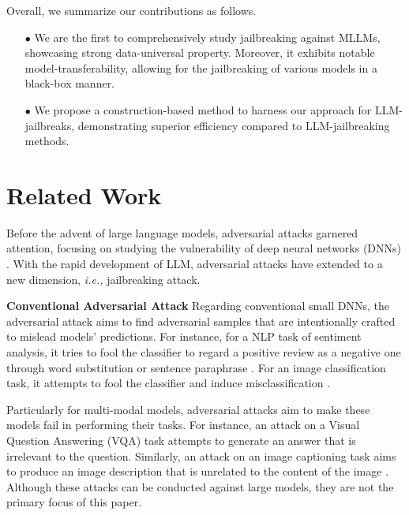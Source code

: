 Overall, we summarize our contributions as follows.
\vspace{-1.0em}
\begin{itemize}
		
\item [$\bullet$] We are the first to comprehensively study jailbreaking against MLLMs, showcasing strong data-universal property. Moreover, it exhibits notable model-transferability, allowing for the jailbreaking of various models in a black-box manner. 

		
\item [$\bullet$] We propose a construction-based method to harness our approach for LLM-jailbreaks, demonstrating superior efficiency compared to LLM-jailbreaking methods. 
		
\end{itemize}

\section{Related Work}
\label{sec:RelatedWork}
Before the advent of large language models, adversarial attacks garnered attention, focusing on studying the vulnerability of deep neural networks (DNNs) \cite{goodfellow2014explaining,madry2017towards,carlini2017towards}. With the rapid development of LLM, adversarial attacks have extended to a new dimension, \emph{i.e.,}  jailbreaking attack.

\noindent\textbf{Conventional Adversarial Attack}
Regarding conventional small DNNs, the adversarial attack aims to find adversarial samples that are intentionally crafted to mislead models’ predictions. For instance, for a NLP task of sentiment analysis, it tries to fool the classifier to regard a positive review as a negative one through word substitution or sentence paraphrase \cite{gehman2020realtoxicityprompts,perez2022red,sheng2019woman,abid2021persistent,carlini2021extracting}. For an image classification task, it attempts to fool the classifier and induce misclassification \cite{naseer2021improving, mahmood2021robustness, wei2022towards, fu2022patch}.  

Particularly for multi-modal models, adversarial attacks aim to make these models fail in performing their tasks. For instance, an attack on a Visual Question Answering (VQA) task attempts to generate an answer that is irrelevant to the question. Similarly, an attack on an image captioning task aims to produce an image description that is unrelated to the content of the image \cite{bailey2023image,carlini2023aligned}. Although these attacks can be conducted against large models, they are not the primary focus of this paper. %

